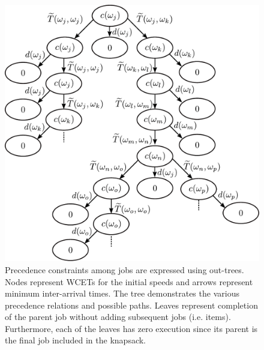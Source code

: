 \begin{figure}
    \centering
    \includegraphics[width=1.0\linewidth]{fig/vectorKnapsackTreeShortenedv5.pdf}
    \caption{Precedence constraints among jobs are expressed using out-trees. Nodes represent WCETs for the initial speeds and arrows represent minimum inter-arrival times. The tree demonstrates the various precedence relations and possible paths. Leaves represent completion of the parent job without adding subsequent jobs (i.e. items). Furthermore, each of the leaves has zero execution since its parent is the final job included in the knapsack.}
    \label{fig:KnapsackTree}
\end{figure}

